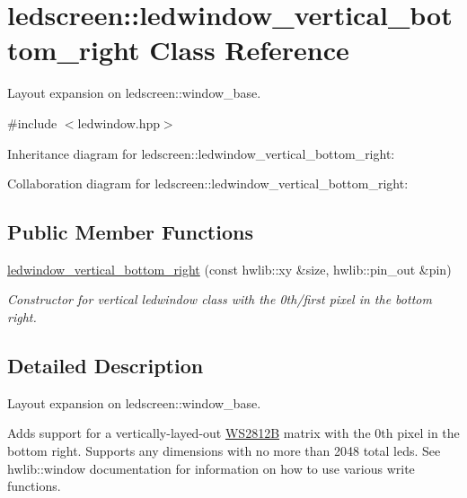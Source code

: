 \hypertarget{classledscreen_1_1ledwindow__vertical__bottom__right}{}\section{ledscreen\+:\+:ledwindow\+\_\+vertical\+\_\+bottom\+\_\+right Class Reference}
\label{classledscreen_1_1ledwindow__vertical__bottom__right}


Layout expansion on ledscreen\+::window\+\_\+base.  




{\ttfamily \#include $<$ledwindow.\+hpp$>$}



Inheritance diagram for ledscreen\+:\+:ledwindow\+\_\+vertical\+\_\+bottom\+\_\+right\+:


Collaboration diagram for ledscreen\+:\+:ledwindow\+\_\+vertical\+\_\+bottom\+\_\+right\+:
\subsection*{Public Member Functions}
\begin{DoxyCompactItemize}
\item 
\hyperlink{classledscreen_1_1ledwindow__vertical__bottom__right_ac8f3b46311e8fcdc77c2c093e464ccfb}{ledwindow\+\_\+vertical\+\_\+bottom\+\_\+right} (const hwlib\+::xy \&size, hwlib\+::pin\+\_\+out \&pin)
\begin{DoxyCompactList}\small\item\em Constructor for vertical ledwindow class with the 0th/first pixel in the bottom right. \end{DoxyCompactList}\end{DoxyCompactItemize}


\subsection{Detailed Description}
Layout expansion on ledscreen\+::window\+\_\+base. 

Adds support for a vertically-\/layed-\/out \hyperlink{classledscreen_1_1WS2812B}{W\+S2812B} matrix with the 0th pixel in the bottom right. Supports any dimensions with no more than 2048 total leds. See hwlib\+::window documentation for information on how to use various write functions. 

